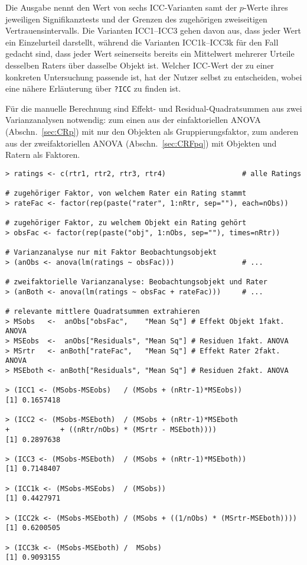 Die Ausgabe nennt den Wert von sechs ICC-Varianten samt der $p$-Werte ihres jeweiligen Signifikanztests und der Grenzen des zugehörigen zweiseitigen Vertrauensintervalls. Die Varianten ICC1--ICC3 gehen davon aus, dass jeder Wert ein Einzelurteil darstellt, während die Varianten ICC1k--ICC3k für den Fall gedacht sind, dass jeder Wert seinerseits bereits ein Mittelwert mehrerer Urteile desselben Raters über dasselbe Objekt ist. Welcher ICC-Wert der zu einer konkreten Untersuchung passende ist, hat der Nutzer selbst zu entscheiden, wobei eine nähere Erläuterung über \lstinline!?ICC! zu finden ist.

Für die manuelle Berechnung sind Effekt- und Residual-Quadratsummen aus zwei Varianzanalysen notwendig: zum einen aus der einfaktoriellen ANOVA (Abschn.\ \ref{sec:CRp}) mit nur den Objekten als Gruppierungsfaktor, zum anderen aus der zweifaktoriellen ANOVA (Abschn.\ \ref{sec:CRFpq}) mit Objekten und Ratern als Faktoren.
\begin{lstlisting}
> ratings <- c(rtr1, rtr2, rtr3, rtr4)                  # alle Ratings

# zugehöriger Faktor, von welchem Rater ein Rating stammt
> rateFac <- factor(rep(paste("rater", 1:nRtr, sep=""), each=nObs))

# zugehöriger Faktor, zu welchem Objekt ein Rating gehört
> obsFac <- factor(rep(paste("obj", 1:nObs, sep=""), times=nRtr))

# Varianzanalyse nur mit Faktor Beobachtungsobjekt
> (anObs <- anova(lm(ratings ~ obsFac)))                # ...

# zweifaktorielle Varianzanalyse: Beobachtungsobjekt und Rater
> (anBoth <- anova(lm(ratings ~ obsFac + rateFac)))     # ...

# relevante mittlere Quadratsummen extrahieren
> MSobs   <-  anObs["obsFac",    "Mean Sq"] # Effekt Objekt 1fakt. ANOVA
> MSEobs  <-  anObs["Residuals", "Mean Sq"] # Residuen 1fakt. ANOVA
> MSrtr   <- anBoth["rateFac",   "Mean Sq"] # Effekt Rater 2fakt. ANOVA
> MSEboth <- anBoth["Residuals", "Mean Sq"] # Residuen 2fakt. ANOVA

> (ICC1 <- (MSobs-MSEobs)   / (MSobs + (nRtr-1)*MSEobs))
[1] 0.1657418

> (ICC2 <- (MSobs-MSEboth)  / (MSobs + (nRtr-1)*MSEboth
+            + ((nRtr/nObs) * (MSrtr - MSEboth))))
[1] 0.2897638

> (ICC3 <- (MSobs-MSEboth)  / (MSobs + (nRtr-1)*MSEboth))
[1] 0.7148407

> (ICC1k <- (MSobs-MSEobs)  / (MSobs))
[1] 0.4427971

> (ICC2k <- (MSobs-MSEboth) / (MSobs + ((1/nObs) * (MSrtr-MSEboth))))
[1] 0.6200505

> (ICC3k <- (MSobs-MSEboth) /  MSobs)
[1] 0.9093155
\end{lstlisting}

